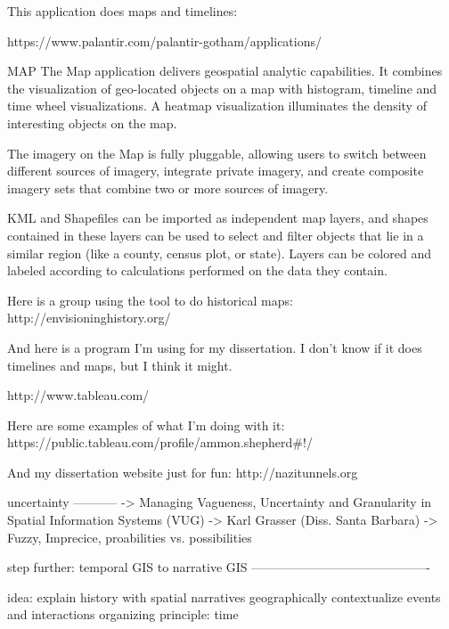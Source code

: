 This application does maps and timelines:

https://www.palantir.com/palantir-gotham/applications/

MAP
The Map application delivers geospatial analytic capabilities. It combines the visualization of geo-located objects on a map with histogram, timeline and time wheel visualizations. A heatmap visualization illuminates the density of interesting objects on the map.

The imagery on the Map is fully pluggable, allowing users to switch between different sources of imagery, integrate private imagery, and create composite imagery sets that combine two or more sources of imagery.

KML and Shapefiles can be imported as independent map layers, and shapes contained in these layers can be used to select and filter objects that lie in a similar region (like a county, census plot, or state). Layers can be colored and labeled according to calculations performed on the data they contain.


Here is a group using the tool to do historical maps: http://envisioninghistory.org/


And here is a program I’m using for my dissertation. I don’t know if it does timelines and maps, but I think it might.

http://www.tableau.com/

Here are some examples of what I’m doing with it: https://public.tableau.com/profile/ammon.shepherd#!/

And my dissertation website just for fun: http://nazitunnels.org



uncertainty
-----------
  -> Managing Vagueness, Uncertainty and Granularity in Spatial Information Systems (VUG)
  -> Karl Grasser (Diss. Santa Barbara)
  -> Fuzzy, Imprecice,
  proabilities vs. possibilities





step further: temporal GIS to narrative GIS
-------------------------------------------

idea: explain history with spatial narratives
  geographically contextualize events and interactions
  organizing principle: time

